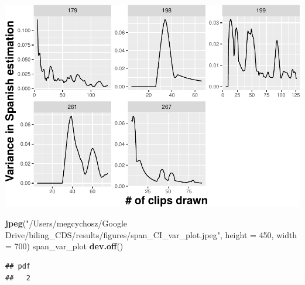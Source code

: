 \documentclass[
]{article}
\newenvironment{Shaded}{\begin{snugshade}}{\end{snugshade}}
\newcommand{\DataTypeTok}[1]{\textcolor[rgb]{0.13,0.29,0.53}{#1}}
\newcommand{\DecValTok}[1]{\textcolor[rgb]{0.00,0.00,0.81}{#1}}
\newcommand{\KeywordTok}[1]{\textcolor[rgb]{0.13,0.29,0.53}{\textbf{#1}}}
\newcommand{\NormalTok}[1]{#1}
\newcommand{\StringTok}[1]{\textcolor[rgb]{0.31,0.60,0.02}{#1}}
\begin{document}
\includegraphics{validation_results_files/figure-latex/plot rolling Spanish variances for US-1.pdf}

\begin{Shaded}
\begin{Highlighting}[]
\KeywordTok{jpeg}\NormalTok{(}\StringTok{"/Users/megcychosz/Google Drive/biling_CDS/results/figures/span_CI_var_plot.jpeg"}\NormalTok{, }\DataTypeTok{height =} \DecValTok{450}\NormalTok{, }\DataTypeTok{width =} \DecValTok{700}\NormalTok{)}
\NormalTok{span_var_plot}
\KeywordTok{dev.off}\NormalTok{()}
\end{Highlighting}
\end{Shaded}

\begin{verbatim}
## pdf 
##   2
\end{verbatim}
\end{document}
